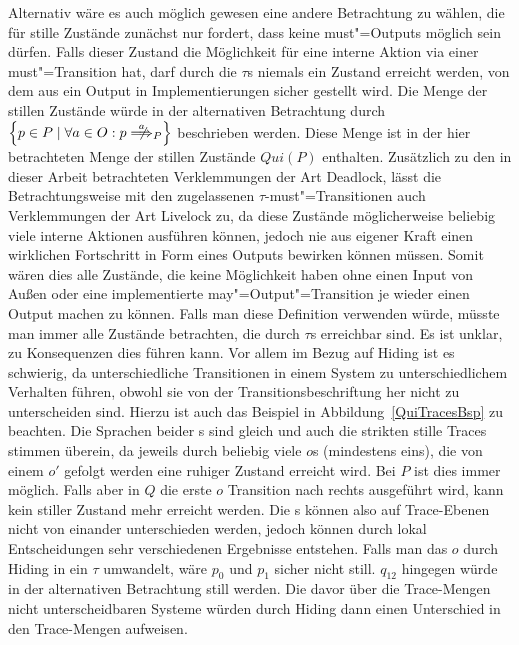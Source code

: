 Alternativ wäre es auch möglich gewesen eine andere Betrachtung zu wählen, die
für stille Zustände zunächst nur fordert, dass keine must"=Outputs möglich sein
dürfen. Falls dieser Zustand die Möglichkeit für eine interne Aktion via einer
must"=Transition hat, darf durch die $\tau$s niemals ein Zustand erreicht
werden, von dem aus ein Output in Implementierungen sicher gestellt wird. Die
Menge der stillen Zustände würde in der alternativen Betrachtung durch
$\left\{p\in P\mid \forall a\in O: p\nweakmust[a]_P \right\}$ beschrieben
werden. Diese Menge ist in der hier betrachteten Menge der stillen Zustände
$Qui (P)$ enthalten. Zusätzlich zu den in dieser Arbeit betrachteten
Verklemmungen der Art Deadlock, lässt die Betrachtungsweise mit den
zugelassenen $\tau$-must"=Transitionen auch Verklemmungen der Art Livelock zu,
da diese Zustände möglicherweise beliebig viele interne Aktionen ausführen
können, jedoch nie aus eigener Kraft einen wirklichen Fortschritt in Form eines
Outputs bewirken können müssen. Somit wären dies alle Zustände, die keine
Möglichkeit haben ohne einen Input von Außen oder eine implementierte
may"=Output"=Transition je wieder einen Output machen zu können. Falls man
diese Definition verwenden würde, müsste man immer alle Zustände betrachten,
die durch $\tau$s erreichbar sind. Es ist unklar, zu Konsequenzen dies führen
kann. Vor allem im Bezug auf Hiding ist es schwierig, da unterschiedliche
Transitionen in einem System zu unterschiedlichem Verhalten führen, obwohl sie
von der Transitionsbeschriftung her nicht zu unterscheiden sind. Hierzu ist
auch das Beispiel in Abbildung~\ref{QuiTracesBsp} zu beachten. Die Sprachen
beider \MEIO{}s sind gleich und auch die strikten stille Traces stimmen
überein, da jeweils durch beliebig viele $o$s (mindestens eins), die von einem
$o'$ gefolgt werden eine ruhiger Zustand erreicht wird. Bei $P$ ist dies immer
möglich. Falls aber in $Q$ die erste $o$ Transition nach rechts ausgeführt
wird, kann kein stiller Zustand mehr erreicht werden. Die \MEIO{}s können also
auf Trace-Ebenen nicht von einander unterschieden werden, jedoch können durch
lokal Entscheidungen sehr verschiedenen Ergebnisse entstehen. Falls man das $o$
durch Hiding in ein $\tau$ umwandelt, wäre $p_0$ und $p_1$ sicher nicht still.
$q_{12}$ hingegen würde in der alternativen Betrachtung still werden. Die davor
über die Trace-Mengen nicht unterscheidbaren Systeme würden durch Hiding dann
einen Unterschied in den Trace-Mengen aufweisen.

